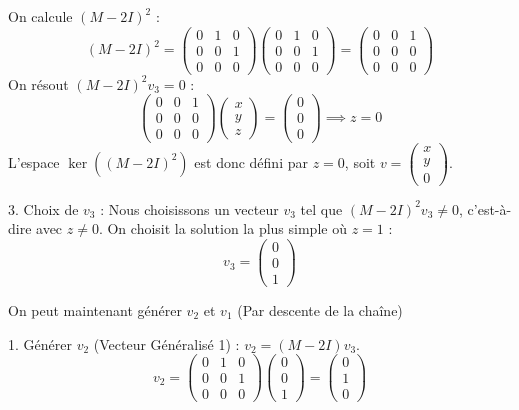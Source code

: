 \documentclass[french]{yLectureNote}
\begin{document}
On calcule $(M - 2I)^2$ :
    $$(M - 2I)^2 = \begin{pmatrix} 0 & 1 & 0 \\ 0 & 0 & 1 \\ 0 & 0 & 0 \end{pmatrix} \begin{pmatrix} 0 & 1 & 0 \\ 0 & 0 & 1 \\ 0 & 0 & 0 \end{pmatrix} = \begin{pmatrix} 0 & 0 & 1 \\ 0 & 0 & 0 \\ 0 & 0 & 0 \end{pmatrix}$$
On résout  $(M - 2I)^2 v_3 = 0$ :
    $$\begin{pmatrix} 0 & 0 & 1 \\ 0 & 0 & 0 \\ 0 & 0 & 0 \end{pmatrix} \begin{pmatrix} x \\ y \\ z \end{pmatrix} = \begin{pmatrix} 0 \\ 0 \\ 0 \end{pmatrix} \implies z = 0$$
    L'espace $\ker((M - 2I)^2)$ est donc défini par $z=0$, soit $v = \begin{pmatrix} x \\ y \\ 0 \end{pmatrix}$.

3.  Choix de $v_3$ : Nous choisissons un vecteur $v_3$ tel que $(M - 2I)^2 v_3 \neq 0$, c'est-à-dire avec $z \neq 0$.
    On choisit la solution la plus simple où $z=1$ :
    $$v_3 = \begin{pmatrix} 0 \\ 0 \\ 1 \end{pmatrix}$$

On peut maintenant générer $v_2$ et $v_1$ (Par descente de la chaîne)

1.  Générer $v_2$ (Vecteur Généralisé 1) : $v_2 = (M - 2I) v_3$.
    $$v_2 = \begin{pmatrix} 0 & 1 & 0 \\ 0 & 0 & 1 \\ 0 & 0 & 0 \end{pmatrix} \begin{pmatrix} 0 \\ 0 \\ 1 \end{pmatrix} = \begin{pmatrix} 0 \\ 1 \\ 0 \end{pmatrix}$$
\end{document}
